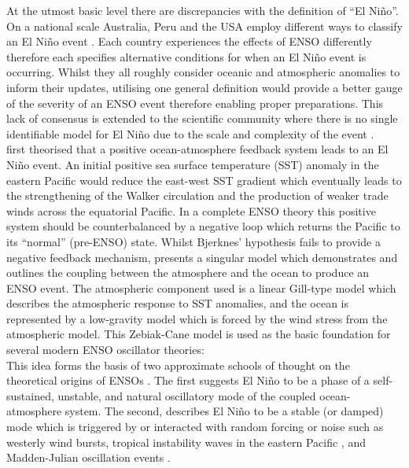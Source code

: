 \documentclass[12pt, onecolumn]{revtex4}    %
\begin{document}
At the utmost basic level there are discrepancies with the definition of ``El Ni\~{n}o''. On a national scale Australia, Peru and the USA employ different ways to classify an El Ni\~{n}o event \citep{doi:10.1175/BAMS-D-16-0009.1}. Each country experiences the effects of ENSO differently therefore each specifies alternative conditions for when an El Ni\~{n}o event is occurring. Whilst they all roughly consider oceanic and atmospheric anomalies to inform their updates, utilising one general definition would provide a better gauge of the severity of an ENSO event therefore enabling proper preparations. This lack of consensus is extended to the scientific community where there is no single identifiable model for El Ni\~{n}o due to the scale and complexity of the event \citep{1997BAMS...78.2771T}. \\


\cite{doi:10.1175/1520-04931969097} first theorised that a positive ocean-atmosphere feedback system leads to an El Ni\~{n}o event. An initial positive sea surface temperature (SST) anomaly in the eastern Pacific would reduce the east-west SST gradient which eventually leads to the strengthening of the Walker circulation and the production of weaker trade winds across the equatorial Pacific. In a complete ENSO theory this positive system should be counterbalanced by a negative loop which returns the Pacific to its ``normal'' (pre-ENSO) state. Whilst Bjerknes' hypothesis fails to provide a negative feedback mechanism, \cite{Zebiak:1987aa} presents a singular model which demonstrates and outlines the coupling between the atmosphere and the ocean to produce an ENSO event. The atmospheric component used is a linear Gill-type model \citep{Gill:1980aa} which describes the atmospheric response to SST anomalies, and the ocean is represented by a low-gravity model which is forced by the wind stress from the atmospheric model. This Zebiak-Cane model is used as the basic foundation for several modern ENSO oscillator theories:   \\

This idea forms the basis of two approximate schools of thought on the theoretical origins of ENSOs \citep{wang2017nino}. The first suggests El Ni\~{n}o to be a phase of a self-sustained, unstable, and natural oscillatory mode of the coupled ocean-atmosphere system. The second, describes El Ni\~{n}o to be a stable (or damped) mode which is triggered by or interacted with random forcing or noise such as westerly wind bursts, tropical instability waves in the eastern Pacific \citep{An:2008aa}, and Madden-Julian oscillation events \citep{doi:10.1175/JAS4029.1}.  \\
\end{document}
